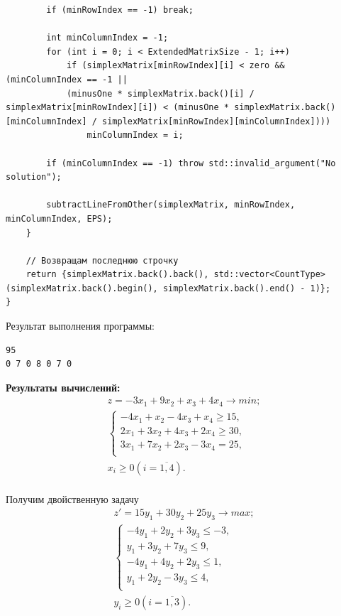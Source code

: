 \documentclass[a4paper,14pt]{extarticle}
\begin{document}
\begin{verbatim}
        if (minRowIndex == -1) break;

        int minColumnIndex = -1;
        for (int i = 0; i < ExtendedMatrixSize - 1; i++)
            if (simplexMatrix[minRowIndex][i] < zero && (minColumnIndex == -1 || 
            (minusOne * simplexMatrix.back()[i] / simplexMatrix[minRowIndex][i]) < (minusOne * simplexMatrix.back()[minColumnIndex] / simplexMatrix[minRowIndex][minColumnIndex])))
                minColumnIndex = i;

        if (minColumnIndex == -1) throw std::invalid_argument("No solution"); 

        subtractLineFromOther(simplexMatrix, minRowIndex, minColumnIndex, EPS);
    }

    // Возвращам последнюю строчку
    return {simplexMatrix.back().back(), std::vector<CountType>(simplexMatrix.back().begin(), simplexMatrix.back().end() - 1)};
}
\end{verbatim}

Результат выполнения программы:
\begin{verbatim}
95
0 7 0 8 0 7 0
\end{verbatim}

\textbf{Результаты вычислений: }\\
\begin{equation*}
    \begin{aligned}
        z = -3x_1 + 9x_2 + x_3 + 4x_4 \rightarrow min; \\
        \begin{cases}
            -4x_1 + x_2 - 4x_3 + x_4 \geq 15,  \\
            2x_1 + 3x_2 + 4x_3 + 2x_4 \geq 30, \\
            3x_1 + 7x_2 + 2x_3 - 3x_4 = 25,    \\
        \end{cases}             \\
        x_i \geq 0 (i=\overline{1, 4}).
    \end{aligned}
\end{equation*}\\
Получим двойственную задачу
\begin{equation*}
    \begin{aligned}
        z' = 15y_1 + 30y_2 + 25y_3 \rightarrow max; \\
        \begin{cases}
            -4y_1 + 2y_2 + 3y_3 \leq -3, \\
            y_1 + 3y_2 + 7y_3 \leq 9,    \\
            -4y_1 + 4y_2 + 2y_3 \leq 1,  \\
            y_1 + 2y_2 - 3y_3 \leq 4,    \\
        \end{cases}                \\
        y_i \geq 0 (i=\overline{1, 3}).
    \end{aligned}
\end{equation*}\\
\end{document}
